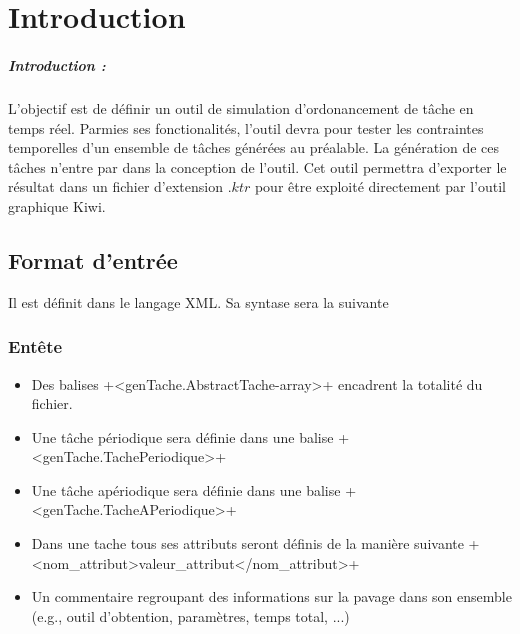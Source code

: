 \chapter{Introduction}
\paragraph{Introduction :}
 L'objectif est de définir un outil de simulation  d'ordonancement de tâche en temps réel. Parmies ses fonctionalités, l'outil devra pour tester les contraintes temporelles d'un ensemble de tâches générées au préalable. La génération de ces tâches n'entre par dans la conception de l'outil. Cet outil permettra d'exporter le résultat dans un fichier  d'extension $.ktr$ pour être exploité directement par l'outil graphique Kiwi.
 
\section{Format d'entrée}
Il est définit dans le langage XML. Sa syntase sera la suivante
\subsection{Entête}
\begin{itemize}
\item
Des balises \veb+<genTache.AbstractTache-array>+ encadrent la totalité du fichier.
\item
Une tâche périodique sera définie dans une balise  \veb+<genTache.TachePeriodique>+ 
\item
Une tâche apériodique sera définie dans une balise  \veb+<genTache.TacheAPeriodique>+ 
\item
Dans une tache tous ses attributs seront définis de la manière suivante \veb+<nom_attribut>valeur_attribut</nom_attribut>+
\item
Un commentaire regroupant des informations sur la pavage dans son ensemble (e.g., outil d'obtention, paramètres, temps total, ...)
\end{itemize}
